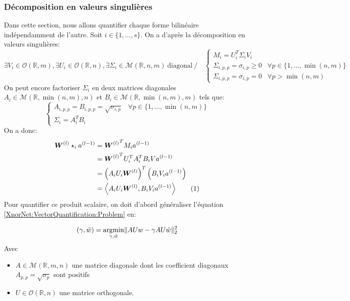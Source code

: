 \subsubsection{Décomposition en valeurs singulières}
Dans cette section, nous allons quantifier chaque forme bilinéaire indépendamment de l'autre.
\newline Soit $i\in\{1,\dots,s\}.$  On a d'après la décomposition en valeurs singulières:
\begin{equation*}
	\exists V_i\in \mathcal{O}(\mathbb{R},m),\exists U_i\in\mathcal{O}(\mathbb{R},n),\exists \Sigma_i\in\mathcal{M}(\mathbb{R},n,m) \ \text{diagonal}\ / \quad \begin{cases}
		M_i= U_i^T \Sigma_i V_i \\ 
		\Sigma_{i,p,p}=\sigma_{i,p} \ge 0 & \forall p\in\{1,\dots,\min(n,m)\} \\
		\Sigma_{i,p,p}=\sigma_{i,p} = 0 & \forall p> \min(n,m)
	\end{cases}
\end{equation*}
On peut encore factoriser $\Sigma_i$ en deux matrices diagonales $A_i\in\mathcal{M}(\mathbb{R},\min(n,m),n)$ et $B_i \in\mathcal{M}(\mathbb{R},\min(n,m),m)$ tels que:
\begin{equation}
	\begin{cases}
	A_{i,p,p}=B_{i,p,p} = \sqrt{\sigma_{i,p}}  &  \forall p \in\{1,\dots,\min(n,m)\} \\
	\Sigma_i = A_i^TB_i
	\end{cases}
\end{equation}
On a donc: 
\begin{align*}
	\boldsymbol{W}^{(l)}\star_i a^{(l-1)} &= {\boldsymbol{W}^{(l)}}^T M_i a^{(l-1)} \\
	&= {\boldsymbol{W}^{(l)}}^T U_i^T A_i^T B_i V a^{(l-1)} \\
	&=\left(A_iU_i \boldsymbol{W}^{(l)}  \right)^T \left(B_i V_i a^{(l-1)}\right) \\
	&= \left\langle A_iU_i \boldsymbol{W}^{(l)}  , B_i V_i a^{(l-1)}  \right\rangle  \addtocounter{equation}{1}\tag{\theequation}
\end{align*}
Pour quantifier ce produit scalaire, on doit d'abord généraliser l'équation \eqref{XnorNet:VectorQuantification:Problem} en:

\begin{equation}\label{XnorNet:TransformedVectorQuantification}
	(\gamma,\tilde{w})=\operatorname*{\arg\!\min}_{\gamma,\tilde{w}} \lVert A U w -  \gamma A U \tilde{w} \rVert_2^2
\end{equation}
Avec \begin{itemize}
	\item $A\in\mathcal{M}(\mathbb{R},m,n)$ une matrice diagonale dont les coefficient diagonaux $A_{p,p}=\sqrt{\sigma_p}$ sont positifs
	\item $U\in\mathcal{O}(\mathbb{R},n)$ une matrice orthogonale. 
\end{itemize}
